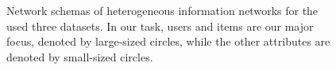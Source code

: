 \begin{figure}[t]
{\begin{minipage}[b]{0.3\textwidth}
\end{minipage}
}
\caption{\label{fig_schema}Network schemas of heterogeneous information networks for the used three datasets.
In our task, users and items are our major focus, denoted by large-sized circles, while the other attributes are denoted by small-sized circles. }

\end{figure}

